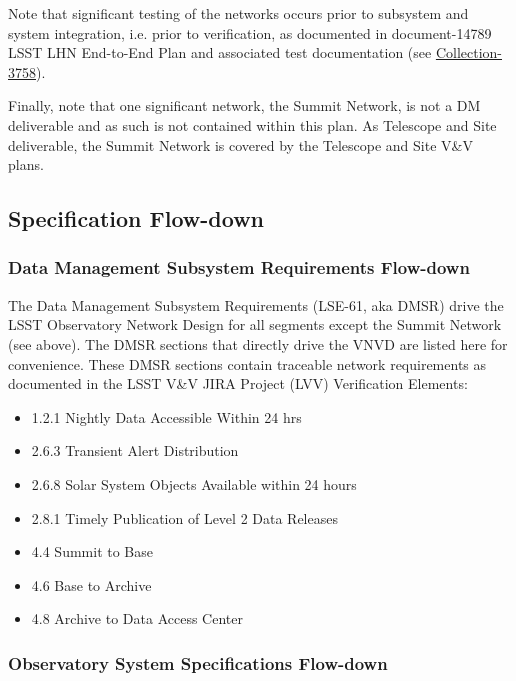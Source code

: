 \documentclass[DM,lsstdraft,STS,toc]{lsstdoc}
\begin{document}
Note that significant testing of the networks occurs prior to subsystem and system integration,
i.e. prior to verification, as documented in document-14789 LSST LHN End-to-End Plan and
associated test documentation 
(see \href{https://docushare.lsstcorp.org/docushare/dsweb/View/Collection-3758}{Collection-3758}).

Finally, note that one significant network, the Summit Network, is not a DM deliverable and as
such is not contained within this plan. As Telescope and Site deliverable, the Summit Network
is covered by the Telescope and Site V\&V plans.

\subsection{Specification Flow-down}\label{sec:sepcflowd}

\subsubsection{Data Management Subsystem Requirements Flow-down}\label{sec:dmreqflowd}

The Data Management Subsystem Requirements (LSE-61, aka DMSR) drive the LSST Observatory Network Design 
for all segments except the Summit Network (see above).  The DMSR sections that directly drive the 
VNVD are listed here for convenience. These DMSR sections contain traceable network requirements as 
documented in the LSST V\&V JIRA Project (LVV) Verification Elements:

\begin{itemize}
\item 1.2.1 Nightly Data Accessible Within 24 hrs
\item 2.6.3 Transient Alert Distribution
\item 2.6.8 Solar System Objects Available within 24 hours
\item 2.8.1 Timely Publication of Level 2 Data Releases
\item 4.4 Summit to Base
\item 4.6 Base to Archive
\item 4.8 Archive to Data Access Center
\end{itemize}

\subsubsection{Observatory System Specifications Flow-down}\label{sec:ossflowd}
\end{document}

